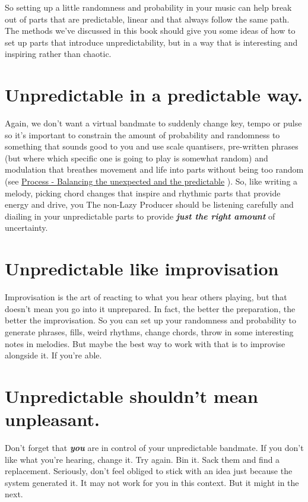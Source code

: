 \documentclass[
  12pt,
  letterpaper,
  oneside,
  open=any]{scrbook}
\begin{document}
So setting up a little randomness and probability in your music can help
break out of parts that are predictable, linear and that always follow
the same path. The methods we've discussed in this book should give you
some ideas of how to set up parts that introduce unpredictability, but
in a way that is interesting and inspiring rather than chaotic.

\section{Unpredictable in a predictable
way.}\label{unpredictable-in-a-predictable-way.}

Again, we don't want a virtual bandmate to suddenly change key, tempo or
pulse so it's important to constrain the amount of probability and
randomness to something that sounds good to you and use scale
quantisers, pre-written phrases (but where which specific one is going
to play is somewhat random) and modulation that breathes movement and
life into parts without being too random (see
\hyperref[Chapter-008-Process-Balance_unexpected_and_predictable]{Process
- Balancing the unexpected and the predictable} ). So, like writing a
melody, picking chord changes that inspire and rhythmic parts that
provide energy and drive, you The non-Lazy Producer should be listening
carefully and diailing in your unpredictable parts to provide
\textbf{\emph{just the right amount}} of uncertainty.

\section{Unpredictable like
improvisation}\label{unpredictable-like-improvisation}

Improvisation is the art of reacting to what you hear others playing,
but that doesn't mean you go into it unprepared. In fact, the better the
preparation, the better the improvisation. So you can set up your
randomness and probability to generate phrases, fills, weird rhythms,
change chords, throw in some interesting notes in melodies. But maybe
the best way to work with that is to improvise alongside it. If you're
able.

\section{Unpredictable shouldn't mean
unpleasant.}\label{unpredictable-shouldnt-mean-unpleasant.}

Don't forget that \textbf{\emph{you}} are in control of your
unpredictable bandmate. If you don't like what you're hearing, change
it. Try again. Bin it. Sack them and find a replacement. Seriously,
don't feel obliged to stick with an idea just because the system
generated it. It may not work for you in this context. But it might in
the next.
\end{document}
